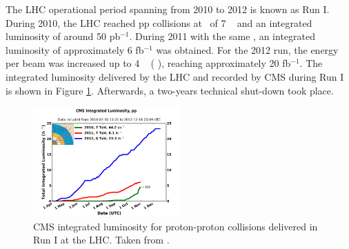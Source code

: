 The LHC operational period spanning from 2010 to 2012 is known as Run I. During 2010, the LHC 
reached pp collisions at \centermassenergy~of 7 \TeV~ and an integrated luminosity of around 
50 pb$^{-1}$. During 2011 with the same \centermassenergy, an integrated luminosity of approximately 
6 fb$^{-1}$ was obtained. For the 2012 run, the energy per beam was increased 
up to 4 \TeV~ ( \TeV), reaching approximately 20 fb$^{-1}$. The integrated luminosity delivered 
by the LHC and recorded by CMS during Run I is shown in Figure \ref{figchp2:luminosityRunI}. Afterwards, a two-years
technical shut-down took place. \\

\begin{figure}[ht]
    \begin{center}
      \includegraphics[width=0.5\textwidth]{figuras/Chapter2/CMSluminosityRunI.jpg}
      \caption{CMS integrated luminosity for proton-proton collisions delivered
      in Run I at the LHC. Taken from \cite{chp2:LHCluminosity}.}
     \label{figchp2:luminosityRunI}
    \end{center}
\end{figure}

